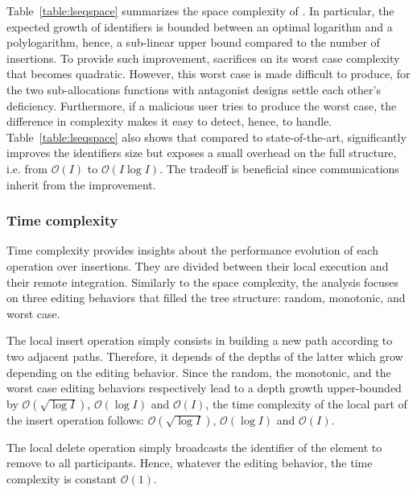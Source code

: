 Table~\ref{table:lseqspace} summarizes the space complexity of \LSEQ. In
particular, the expected growth of identifiers is bounded between an optimal
logarithm and a polylogarithm, hence, a sub-linear upper bound compared to the
number of insertions. To provide such improvement, \LSEQ sacrifices on its worst
case complexity that becomes quadratic. However, this worst case is made
difficult to produce, for the two sub-allocations functions with antagonist
designs settle each other's deficiency. Furthermore, if a malicious user tries
to produce the worst case, the difference in complexity makes it easy to detect,
hence, to handle. Table~\ref{table:lseqspace} also shows that compared to
state-of-the-art, \LSEQ significantly improves the identifiers size but exposes
a small overhead on the full structure, i.e. from $\mathcal{O}(I)$ to
$\mathcal{O}(I\log I)$. The tradeoff is beneficial since communications inherit
from the improvement.

\subsubsection{Time complexity}
\label{subsubsec:time}

Time complexity provides insights about the performance evolution of each
operation over insertions. They are divided between their local execution and
their remote integration.  Similarly to the space complexity, the analysis
focuses on three editing behaviors that filled the tree structure: random,
monotonic, and worst case.

The local insert operation simply consists in building a new path according to
two adjacent paths. Therefore, it depends of the depths of the latter which grow
depending on the editing behavior. Since the random, the monotonic, and the
worst case editing behaviors respectively lead to a depth growth upper-bounded
by $\mathcal{O}(\sqrt{\log I})$, $\mathcal{O}(\log I)$ and $\mathcal{O}(I)$, the
time complexity of the local part of the insert operation follows:
$\mathcal{O}(\sqrt{\log I})$, $\mathcal{O}(\log I)$ and $\mathcal{O}(I)$.

The local delete operation simply broadcasts the identifier of the element to
remove to all participants. Hence, whatever the editing behavior, the time
complexity is constant $\mathcal{O}(1)$.

